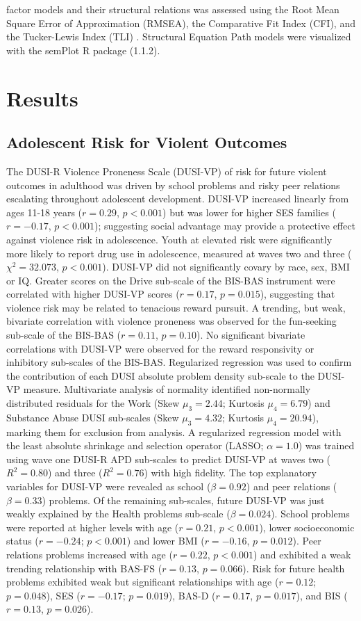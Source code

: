 \documentclass[utf8]{article}
\begin{document}
factor models and their structural relations was assessed using the Root Mean Square Error of Approximation (RMSEA), the Comparative Fit Index (CFI), and the Tucker-Lewis Index (TLI) \citep{KennyEtAl2015,HuTzeBentler1999, wu2009evaluating}. Structural Equation Path models were visualized with the semPlot R package (1.1.2). 
\section*{Results} 
\subsection*{Adolescent Risk for Violent Outcomes} The DUSI-R Violence Proneness Scale (DUSI-VP) of risk for future violent outcomes in adulthood was driven by school problems and risky peer relations escalating throughout adolescent development. DUSI-VP increased linearly from ages 11-18 years ($r=0.29$,  $p<0.001$) but was lower for higher SES families ($r=-0.17$, $p<0.001$); suggesting social advantage may provide a protective effect against violence risk in adolescence. Youth at elevated risk were significantly more likely to report drug use in adolescence, measured at waves two and three ($\chi^2 = 32.073$, $p<0.001$). DUSI-VP did not significantly covary by race, sex, BMI or IQ. Greater scores on the Drive sub-scale of the BIS-BAS instrument were correlated with higher DUSI-VP scores ($r=0.17$, $p=0.015$), suggesting that violence risk may be related to tenacious reward pursuit. A trending, but weak, bivariate correlation with violence proneness was observed for the fun-seeking sub-scale of the BIS-BAS ($r=0.11$, $p=0.10$). No significant bivariate correlations with DUSI-VP were observed for the reward responsivity or inhibitory sub-scales of the BIS-BAS. Regularized regression was used to confirm the contribution of each DUSI absolute problem density sub-scale to the DUSI-VP measure. Multivariate analysis of normality identified non-normally distributed residuals for the Work (Skew $\mu_3=2.44$; Kurtosis $\mu_4=6.79$) and Substance Abuse DUSI sub-scales (Skew $\mu_3=4.32$; Kurtosis $\mu_4=20.94$), marking them for exclusion from analysis. A regularized regression model with the least absolute shrinkage and selection operator (LASSO; $\alpha=1.0$) was trained using wave one DUSI-R APD sub-scales to predict DUSI-VP at waves two ($R^2=0.80$) and three ($R^2=0.76$) with high fidelity. The top explanatory variables for DUSI-VP were revealed as school ($\beta=0.92$) and peer relations ($\beta=0.33$) problems. Of the remaining sub-scales, future DUSI-VP was just weakly explained by the Health problems sub-scale ($\beta=0.024$). School problems were reported at higher levels with age ($r=0.21$, $p<0.001$), lower socioeconomic status ($r=-0.24$; $p<0.001$) and lower BMI ($r=-0.16$, $p=0.012$). Peer relations problems increased with age ($r=0.22$, $p<0.001$) and exhibited a weak trending relationship with BAS-FS ($r=0.13$, $p=0.066$). Risk for future health problems exhibited weak but significant relationships with age ($r=0.12$; $p=0.048$), SES ($r=-0.17$; $p=0.019$), BAS-D ($r=0.17$, $p=0.017$), and BIS ($r=0.13$, $p=0.026$). 
%
\vspace{20pt}
\end{document}

